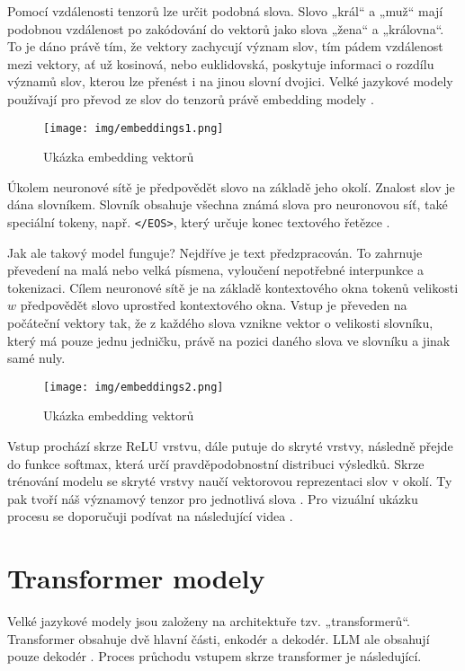 \documentclass[FM,DP]{tulthesis}
\begin{document}
		Pomocí vzdálenosti tenzorů lze určit podobná slova. Slovo „král“ a „muž“ mají podobnou vzdálenost po zakódování do vektorů jako slova „žena“ a „královna“. To je dáno právě tím, že vektory zachycují význam slov, tím pádem vzdálenost mezi vektory, ať už kosinová, nebo euklidovská, poskytuje informaci o rozdílu významů slov, kterou lze přenést i na jinou slovní dvojici. Velké jazykové modely používají pro převod ze slov do tenzorů právě embedding modely \cite{embeddings} \cite{embeddings2}.
		
		\begin{figure}[H]
			\centering
			\texttt{[image: img/embeddings1.png]}
			\caption{Ukázka embedding vektorů \cite{embeddings_img1}}
			\label{fig:e1}
		\end{figure}
		
		Úkolem neuronové sítě je předpovědět slovo na základě jeho okolí. Znalost slov je dána slovníkem. Slovník obsahuje všechna známá slova pro neuronovou síť, také speciální tokeny, např. \verb|</EOS>|, který určuje konec textového řetězce \cite{embeddings2}. 
		
		Jak ale takový model funguje? Nejdříve je text předzpracován. To zahrnuje převedení na malá nebo velká písmena, vyloučení nepotřebné interpunkce a tokenizaci. Cílem neuronové sítě je na základě kontextového okna tokenů velikosti $w$ předpovědět slovo uprostřed kontextového okna. Vstup je převeden na počáteční vektory tak, že z každého slova vznikne vektor o velikosti slovníku, který má pouze jednu jedničku, právě na pozici daného slova ve slovníku a jinak samé nuly.
		
		\begin{figure}[H]
			\centering
			\texttt{[image: img/embeddings2.png]}
			\caption{Ukázka embedding vektorů \cite{embeddings_img2}}
			\label{fig:e2}
		\end{figure}
		
		Vstup prochází skrze ReLU vrstvu, dále putuje do skryté vrstvy, následně přejde do funkce softmax, která určí pravděpodobnostní distribuci výsledků. Skrze trénování modelu se skryté vrstvy naučí vektorovou reprezentaci slov v okolí. Ty pak tvoří náš významový tenzor pro jednotlivá slova \cite{paper:word2vec} \cite{tokenization}. Pro vizuální ukázku procesu se doporučuji podívat na následující videa \cite{ytb:embeddings} \cite{ytb:word2vec}.
		
		\section{Transformer modely} \label{transformers}
		Velké jazykové modely jsou založeny na architektuře tzv. „transformerů“. Transformer obsahuje dvě hlavní části, enkodér a dekodér. LLM ale obsahují pouze dekodér \cite{rothman2021transformers}. Proces průchodu vstupem skrze transformer je následující.
		
\end{document}
